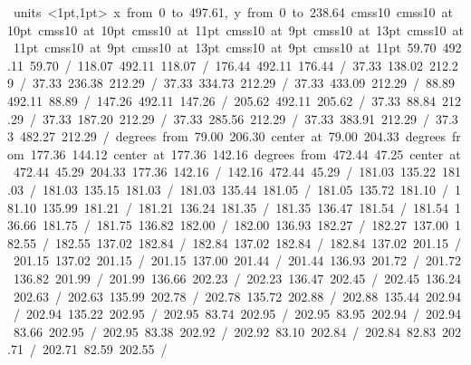 \documentclass[12pt,a4paper]{report}
\begin{document}
\hbox{\beginpicture
\setcoordinatesystem units <1pt,1pt>
\setplotarea x from 0 to 497.61, y from 0 to 238.64
\setlinear
\font\picfont cmss10\picfont
\font\picfont cmss10 at 10pt\picfont
\font\picfont cmss10 at 10pt\picfont
\font\picfont cmss10 at 11pt\picfont
\font\picfont cmss10 at 9pt\picfont
\font\picfont cmss10 at 13pt\picfont
\font\picfont cmss10 at 11pt\picfont
\font\picfont cmss10 at 9pt\picfont
\font\picfont cmss10 at 13pt\picfont
\font\picfont cmss10 at 9pt\picfont
\font\picfont cmss10 at 11pt\picfont
\setsolid
{} 59.70 492.11 59.70 /
\setsolid
{} 118.07 492.11 118.07 /
\setsolid
{} 176.44 492.11 176.44 /
\setsolid
{} 37.33 138.02 212.29 /
\setsolid
{} 37.33 236.38 212.29 /
\setsolid
{} 37.33 334.73 212.29 /
\setsolid
{} 37.33 433.09 212.29 /
\setsolid
{} 88.89 492.11 88.89 /
\setsolid
{} 147.26 492.11 147.26 /
\setsolid
{} 205.62 492.11 205.62 /
\setsolid
{} 37.33 88.84 212.29 /
\setsolid
{} 37.33 187.20 212.29 /
\setsolid
{} 37.33 285.56 212.29 /
\setsolid
{} 37.33 383.91 212.29 /
\setsolid
{} 37.33 482.27 212.29 /
 degrees from 79.00 206.30 center at 79.00 204.33
 degrees from 177.36 144.12 center at 177.36 142.16
 degrees from 472.44 47.25 center at 472.44 45.29
\setsolid
{} 204.33 177.36 142.16 /
 142.16 472.44 45.29 /
\setsolid
{} 181.03 135.22 181.03 /
 181.03 135.15 181.03 /
 181.03 135.44 181.05 /
 181.05 135.72 181.10 /
 181.10 135.99 181.21 /
 181.21 136.24 181.35 /
 181.35 136.47 181.54 /
 181.54 136.66 181.75 /
 181.75 136.82 182.00 /
 182.00 136.93 182.27 /
 182.27 137.00 182.55 /
 182.55 137.02 182.84 /
 182.84 137.02 182.84 /
 182.84 137.02 201.15 /
 201.15 137.02 201.15 /
 201.15 137.00 201.44 /
 201.44 136.93 201.72 /
 201.72 136.82 201.99 /
 201.99 136.66 202.23 /
 202.23 136.47 202.45 /
 202.45 136.24 202.63 /
 202.63 135.99 202.78 /
 202.78 135.72 202.88 /
 202.88 135.44 202.94 /
 202.94 135.22 202.95 /
 202.95 83.74 202.95 /
 202.95 83.95 202.94 /
 202.94 83.66 202.95 /
 202.95 83.38 202.92 /
 202.92 83.10 202.84 /
 202.84 82.83 202.71 /
 202.71 82.59 202.55 /
}
\end{document}
